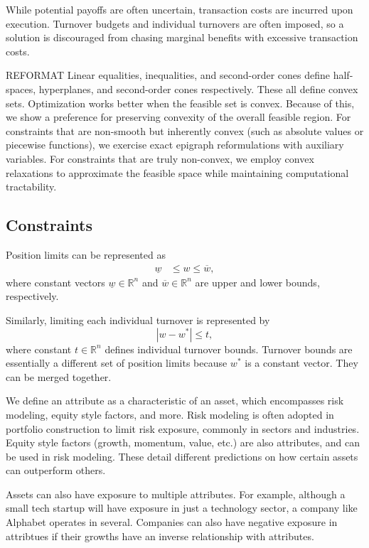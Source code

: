 \documentclass[11pt, letterpaper]{article}
\begin{document}
While potential payoffs are often uncertain, transaction costs are incurred upon execution. Turnover budgets and individual
turnovers are often imposed, so a solution is discouraged from chasing marginal benefits with excessive transaction costs.

REFORMAT
Linear equalities, inequalities, and second-order cones define half-spaces, hyperplanes, and second-order cones respectively.
These all define convex sets. Optimization works better
when the feasible set is convex. Because of this, we show a preference for preserving convexity of the overall
feasible region. For constraints that are non-smooth but inherently convex (such as absolute values or piecewise functions), we
exercise exact epigraph reformulations with auxiliary variables. For constraints that are truly non-convex, we employ convex
relaxations to approximate the feasible space while maintaining computational tractability.

\subsection{Constraints}
Position limits can be represented as
\begin{align*}
    \underline{w} & \leq w \leq \overline{w},
\end{align*}
where constant vectors $\underline{w} \in \mathds{R}^n$ and $\overline{w} \in \mathds{R}^n$ are upper and lower bounds, respectively.

Similarly, limiting each individual turnover is represented by
\begin{equation*}
    |w - w^*| \leq t,
\end{equation*}
where constant $t \in \mathds{R}^n$ defines individual turnover bounds. Turnover bounds are essentially a different set of
position limits because $w^*$ is a constant vector. They can be merged together.

We define an attribute as a characteristic of an asset, which encompasses risk modeling, equity style factors, and more. Risk
modeling is often adopted in portfolio construction to limit risk exposure, commonly in sectors and industries. Equity style
factors (growth, momentum, value, etc.) are also attributes, and can be used in risk modeling. These detail different
predictions on how certain assets can outperform others.

Assets can also have exposure to multiple attributes. For example, although a small tech startup will have exposure in just a technology sector, a company like
Alphabet operates in several. Companies can also have negative exposure in attribtues if their growths have an inverse relationship with attributes.
\end{document}
